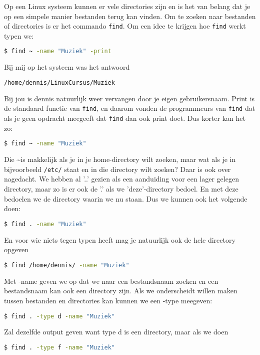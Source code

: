 Op een Linux systeem kunnen er vele directories zijn en is het van belang dat je op een simpele manier bestanden terug kan vinden. Om te zoeken naar bestanden of directories is er het commando \texttt{find}. Om een idee te krijgen hoe \texttt{find} werkt typen we:

\begin{lstlisting}[language=bash]
$ find ~ -name "Muziek" -print
\end{lstlisting}

Bij mij op het systeem was het antwoord
\begin{lstlisting}[language=bash]
/home/dennis/LinuxCursus/Muziek
\end{lstlisting}

Bij jou is dennis natuurlijk weer vervangen door je eigen gebruikersnaam. Print is de standaard functie van \texttt{find}, en daarom vonden de programmeurs van \texttt{find} dat als je geen opdracht meegeeft dat \texttt{find} dan ook print doet. Dus korter kan het zo:
\begin{lstlisting}[language=bash]
$ find ~ -name "Muziek"
\end{lstlisting}

Die \textasciitilde is makkelijk als je in je home-directory wilt zoeken, maar wat als je in bijvoorbeeld \texttt{/etc/} staat en in die directory wilt zoeken? Daar is ook over nagedacht. We hebben al '..' gezien als een aanduiding voor een lager gelegen directory, maar zo is er ook de '.' als we 'deze'-directory bedoel. En met deze bedoelen we de directory waarin we nu staan. Dus we kunnen ook het volgende doen:

\begin{lstlisting}[language=bash]
$ find . -name "Muziek"
\end{lstlisting}

En voor wie niets tegen typen heeft mag je natuurlijk ook de hele directory opgeven
\begin{lstlisting}[language=bash]
$ find /home/dennis/ -name "Muziek"
\end{lstlisting}

Met -name geven we op dat we naar een bestandsnaam zoeken en een bestandsnaam kan ook een directory zijn. Als we onderscheidt willen maken tussen bestanden en directories kan kunnen we een -type meegeven:
\begin{lstlisting}[language=bash]
$ find . -type d -name "Muziek"
\end{lstlisting}

Zal dezelfde output geven want type d is een directory, maar als we doen
\begin{lstlisting}[language=bash]
$ find . -type f -name "Muziek"
\end{lstlisting}

